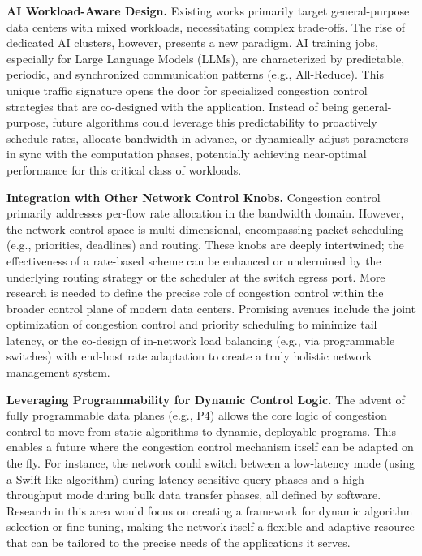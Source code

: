 \documentclass[11pt,en]{elegantpaper}
\begin{document}
\textbf{AI Workload-Aware Design.} Existing works primarily target general-purpose data centers with mixed workloads, necessitating complex trade-offs. The rise of dedicated AI clusters, however, presents a new paradigm. AI training jobs, especially for Large Language Models (LLMs), are characterized by predictable, periodic, and synchronized communication patterns (e.g., All-Reduce). This unique traffic signature opens the door for specialized congestion control strategies that are co-designed with the application. Instead of being general-purpose, future algorithms could leverage this predictability to proactively schedule rates, allocate bandwidth in advance, or dynamically adjust parameters in sync with the computation phases, potentially achieving near-optimal performance for this critical class of workloads.

\textbf{Integration with Other Network Control Knobs.} Congestion control primarily addresses per-flow rate allocation in the bandwidth domain. However, the network control space is multi-dimensional, encompassing packet scheduling (e.g., priorities, deadlines) and routing. These knobs are deeply intertwined; the effectiveness of a rate-based scheme can be enhanced or undermined by the underlying routing strategy or the scheduler at the switch egress port. More research is needed to define the precise role of congestion control within the broader control plane of modern data centers. Promising avenues include the joint optimization of congestion control and priority scheduling to minimize tail latency, or the co-design of in-network load balancing (e.g., via programmable switches) with end-host rate adaptation to create a truly holistic network management system.

\textbf{Leveraging Programmability for Dynamic Control Logic.} The advent of fully programmable data planes (e.g., P4) allows the core logic of congestion control to move from static algorithms to dynamic, deployable programs. This enables a future where the congestion control mechanism itself can be adapted on the fly. For instance, the network could switch between a low-latency mode (using a Swift-like algorithm) during latency-sensitive query phases and a high-throughput mode during bulk data transfer phases, all defined by software. Research in this area would focus on creating a framework for dynamic algorithm selection or fine-tuning, making the network itself a flexible and adaptive resource that can be tailored to the precise needs of the applications it serves.
\end{document}
